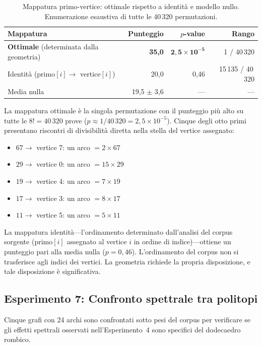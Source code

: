 \documentclass[11pt]{article}
\begin{document}
\begin{table}[H]
\centering
\caption{Mappatura primo-vertice: ottimale rispetto a identit\`a e
  modello nullo. Enumerazione esaustiva di tutte le 40\,320
  permutazioni.}
\label{tab:exp6}
\begin{tabular}{lrrr}
\toprule
Mappatura & Punteggio & $p$-value & Rango \\
\midrule
\textbf{Ottimale} (determinata dalla geometria) & \textbf{35,0} & $\mathbf{2{,}5 \times 10^{-5}}$ & 1 / 40\,320 \\
Identit\`a (primo$[i] \to$ vertice$[i]$) & 20,0 & 0,46 & 15\,135 / 40\,320 \\
Media nulla & 19,5 $\pm$ 3,6 & --- & --- \\
\bottomrule
\end{tabular}
\end{table}

La mappatura ottimale \`e la singola permutazione con il punteggio
pi\`u alto su tutte le $8! = 40\,320$ prove
($p \approx 1/40\,320 = 2{,}5 \times 10^{-5}$). Cinque degli otto primi
presentano riscontri di divisibilit\`a diretta nella stella del vertice
assegnato:
\begin{itemize}
  \item $67 \to$ vertice 7: un arco $= 2 \times 67$
  \item $29 \to$ vertice 0: un arco $= 15 \times 29$
  \item $19 \to$ vertice 4: un arco $= 7 \times 19$
  \item $17 \to$ vertice 3: un arco $= 8 \times 17$
  \item $11 \to$ vertice 5: un arco $= 5 \times 11$
\end{itemize}

La mappatura identit\`a---l'ordinamento determinato dall'analisi del
corpus sorgente (primo$[i]$ assegnato al vertice $i$ in ordine di
indice)---ottiene un punteggio pari alla media nulla ($p = 0{,}46$).
L'ordinamento del corpus non si trasferisce agli indici dei vertici.
La geometria richiede la propria disposizione, e tale disposizione \`e
significativa.

\subsection{Esperimento 7: Confronto spettrale tra politopi}

Cinque grafi con 24 archi sono confrontati sotto pesi del corpus per
verificare se gli effetti spettrali osservati nell'Esperimento~4 sono
specifici del dodecaedro rombico.
\end{document}

